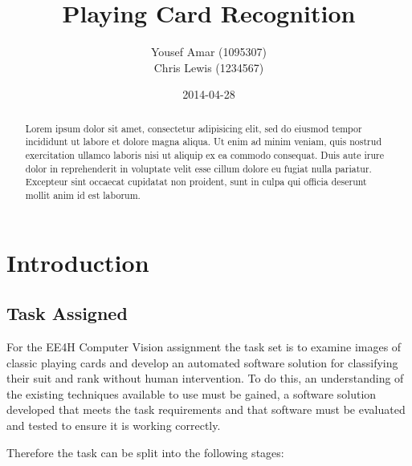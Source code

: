 \documentclass[a4paper,12pt,notitlepage]{article}
\begin{document}
\parskip 2mm

\title{{\huge Playing Card Recognition}\\}
\author{Yousef Amar (1095307)\\Chris Lewis (1234567)}
\date{2014-04-28}
\maketitle
\thispagestyle{empty}
\vfill
\begin{abstract}
	Lorem ipsum dolor sit amet, consectetur adipisicing elit, sed do eiusmod tempor incididunt ut labore et dolore magna aliqua. Ut enim ad minim veniam, quis nostrud exercitation ullamco laboris nisi ut aliquip ex ea commodo consequat. Duis aute irure dolor in reprehenderit in voluptate velit esse cillum dolore eu fugiat nulla pariatur. Excepteur sint occaecat cupidatat non proident, sunt in culpa qui officia deserunt mollit anim id est laborum.
\end{abstract}
\pagebreak

\tableofcontents
\thispagestyle{empty}
\pagebreak
\setcounter{page}{1}

\parskip 2mm

\section{Introduction}
	\subsection{Task Assigned}
		For the EE4H Computer Vision assignment the task set is to examine images of classic playing cards and develop an automated software solution for classifying their suit and rank without human intervention. To do this, an understanding of the existing techniques available to use must be gained, a software solution developed that meets the task requirements and that software must be evaluated and tested to ensure it is working correctly. 

		Therefore the task can be split into the following stages:
\end{document}
